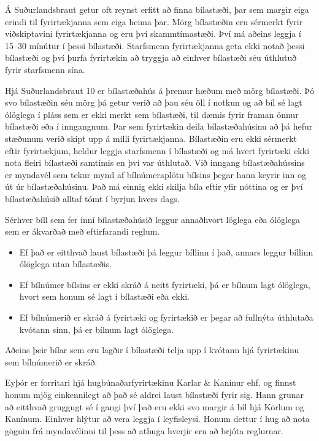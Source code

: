 
Á Suðurlandsbraut getur oft reynst erfitt að finna bílastæði, þar sem margir eiga erindi til fyrirtækjanna sem eiga heima þar.
Mörg bílastæðin eru sérmerkt fyrir viðskiptavini fyrirtækjanna og eru því skammtímastæði.
Því má aðeins leggja í 15--30 mínútur í þessi bílastæði.
Starfsmenn fyrirtækjanna geta ekki notað þessi bílastæði og því þurfa fyrirtækin að tryggja að einhver bílastæði séu úthlutuð fyrir starfsmenn sína.

Hjá Suðurlandsbraut 10 er bílastæðahús á þremur hæðum með mörg bílastæði.
Þó svo bílastæðin séu mörg þá getur verið að þau séu öll í notkun og að bíl sé lagt ólöglega í pláss sem er ekki merkt sem bílastæði, til dæmis fyrir framan önnur bílastæði eða í inngangnum.
Þar sem fyrirtækin deila bílastæðahúsinu að þá hefur stæðunum verið skipt upp á milli fyrirtækjanna.
Bílastæðin eru ekki sérmerkt eftir fyrirtækjum, heldur leggja starfsmenn í bílastæði og má hvert fyrirtæki ekki nota fleiri bílastæði samtímis en því var úthlutað.
Við inngang bílastæðahússins er myndavél sem tekur mynd af bílnúmeraplötu bílsins þegar hann keyrir inn og út úr bílastæðahúsinu.
Það má einnig ekki skilja bíla eftir yfir nóttina og er því bílastæðahúsið alltaf tómt í byrjun hvers dags.

Sérhver bíll sem fer inní bílastæðahúsið leggur annaðhvort löglega eða ólöglega sem er ákvarðað með eftirfarandi reglum.
\begin{itemize}
    \item Ef það er eitthvað laust bílastæði þá leggur bíllinn í það, annars leggur bíllinn ólöglega utan bílastæðis.
    \item Ef bílnúmer bílsins er ekki skráð á neitt fyrirtæki, þá er bílnum lagt ólöglega, hvort sem honum sé lagt í bílastæði eða ekki.
    \item Ef bílnúmerið er skráð á fyrirtæki og fyrirtækið er þegar að fullnýta úthlutaða kvótann sinn, þá er bílnum lagt ólöglega.
\end{itemize}
Aðeins þeir bílar sem eru lagðir í bílastæði telja upp í kvótann hjá fyrirtækinu sem bílnúmerið er skráð.

Eyþór er forritari hjá hugbúnaðarfyrirtækinu Karlar \& Kanínur ehf. og finnst honum mjög einkennilegt að það sé aldrei laust bílastæði fyrir sig.
Hann grunar að eitthvað gruggugt sé í gangi því það eru ekki svo margir á bíl hjá Körlum og Kanínum.
Einhver hlýtur að vera leggja í leyfisleysi.
Honum dettur í hug að nota gögnin frá myndavélinni til þess að athuga hverjir eru að brjóta reglurnar.

